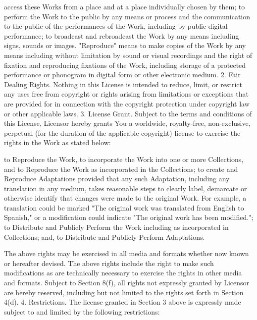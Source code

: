 \documentclass[oneside]{book}
\begin{document}
access these Works from a place and at a place individually chosen by them; to
perform the Work to the public by any means or process and the communication to
the public of the performances of the Work, including by public digital
performance; to broadcast and rebroadcast the Work by any means including signs,
sounds or images.  "Reproduce" means to make copies of the Work by any means
including without limitation by sound or visual recordings and the right of
fixation and reproducing fixations of the Work, including storage of a protected
performance or phonogram in digital form or other electronic medium.  2. Fair
Dealing Rights.  Nothing in this License is intended to reduce, limit, or
restrict any uses free from copyright or rights arising from limitations or
exceptions that are provided for in connection with the copyright protection
under copyright law or other applicable laws.  3. License Grant.  Subject to the
terms and conditions of this License, Licensor hereby grants You a worldwide,
royalty-free, non-exclusive, perpetual (for the duration of the applicable
copyright) license to exercise the rights in the Work as stated below:

to Reproduce the Work, to incorporate the Work into one or more Collections, and
to Reproduce the Work as incorporated in the Collections; to create and
Reproduce Adaptations provided that any such Adaptation, including any
translation in any medium, takes reasonable steps to clearly label, demarcate or
otherwise identify that changes were made to the original Work. For example, a
translation could be marked "The original work was translated from English to
Spanish," or a modification could indicate "The original work has been
modified."; to Distribute and Publicly Perform the Work including as
incorporated in Collections; and, to Distribute and Publicly Perform
Adaptations.

The above rights may be exercised in all media and formats whether now known or
hereafter devised. The above rights include the right to make such modifications
as are technically necessary to exercise the rights in other media and
formats. Subject to Section 8(f), all rights not expressly granted by Licensor
are hereby reserved, including but not limited to the rights set forth in
Section 4(d).  4. Restrictions.  The license granted in Section 3 above is
expressly made subject to and limited by the following restrictions:
\end{document}
